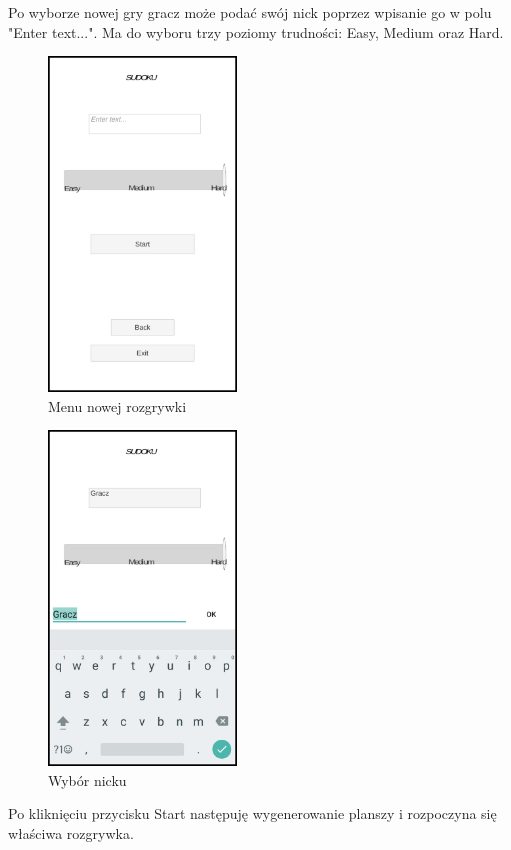 \documentclass[a4paper, 11pt]{article}
\begin{document}
Po wyborze nowej gry gracz może podać swój nick poprzez wpisanie go w polu "Enter text...". Ma do wyboru trzy poziomy trudności: Easy, Medium oraz Hard.
\begin{figure}[H]
	\centering
	\includegraphics[width=5cm]{zrzuty/2.png}
	\caption{Menu nowej rozgrywki}
	\label{fig:menu2}
\end{figure} 
\begin{figure}[H]
	\centering
	\includegraphics[width=5cm]{zrzuty/3.png}
	\caption{Wybór nicku}
	\label{fig:wybor_nicku}
\end{figure}
Po kliknięciu przycisku Start następuję wygenerowanie planszy i rozpoczyna się właściwa rozgrywka.  
\end{document}
